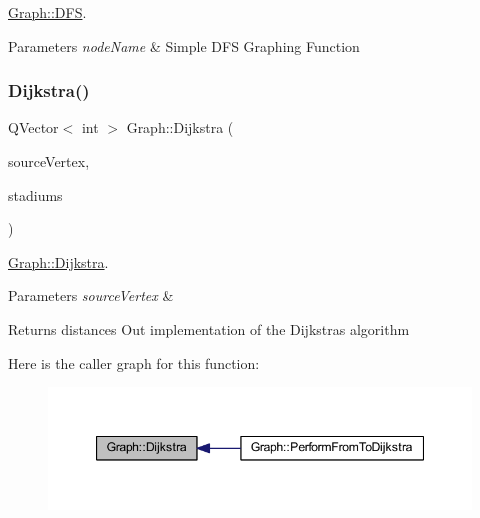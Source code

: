 \mbox{\hyperlink{class_graph_aa13f9b10f1dd61da066dd59901598e56}{Graph\+::\+D\+FS}}. 


\begin{DoxyParams}{Parameters}
{\em node\+Name} & Simple D\+FS Graphing Function \\
\hline
\end{DoxyParams}
\mbox{\label{class_graph_ac4e39e620f96920a506b0d8ce9ee17f1}} 
\subsubsection{\texorpdfstring{Dijkstra()}{Dijkstra()}}
{\footnotesize\ttfamily Q\+Vector$<$ int $>$ Graph\+::\+Dijkstra (\begin{DoxyParamCaption}\item[{int}]{source\+Vertex,  }\item[{Q\+Vector$<$ Q\+String $>$ \&}]{stadiums }\end{DoxyParamCaption})}



\mbox{\hyperlink{class_graph_ac4e39e620f96920a506b0d8ce9ee17f1}{Graph\+::\+Dijkstra}}. 


\begin{DoxyParams}{Parameters}
{\em source\+Vertex} & \\
\hline
\end{DoxyParams}
\begin{DoxyReturn}{Returns}
distances Out implementation of the Dijkstra\textquotesingle{}s algorithm 
\end{DoxyReturn}
Here is the caller graph for this function\+:
\nopagebreak
\begin{figure}[H]
\begin{center}
\leavevmode
\includegraphics[width=347pt]{class_graph_ac4e39e620f96920a506b0d8ce9ee17f1_icgraph}
\end{center}
\end{figure}
\mbox{\label{class_graph_a3102766a44bdc521d67dc1ac57c948b4}} 
